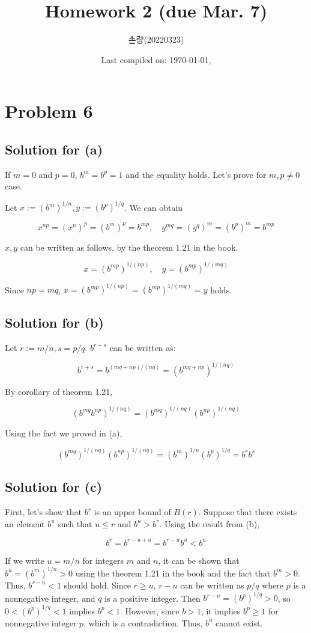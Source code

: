 \documentclass{scrartcl}
\title{Homework 2 (due Mar. 7)}
\author{손량(20220323)}
\date{Last compiled on: \today, \currenttime}
\begin{document}
\maketitle

\section{Problem 6}
\subsection{Solution for (a)}
If \(m = 0\) and \(p = 0\), \(b^m = b^p = 1\) and the equality holds.
Let's prove for \(m, p \not = 0\) case.

Let \(x := (b^m)^{1 / n}, y := (b^p)^{1 / q}\). We can obtain

\[
  x^{np} = (x^n)^p = (b^m)^p = b^{mp},\quad y^{mq} = (y^q)^m = (b^p)^m = b^{mp}
\]

\(x, y\) can be written as follows, by the theorem 1.21 in the book.

\[
  x = (b^{mp})^{1 / (np)}, \quad y = (b^{mp})^{1 / (mq)}
\]

Since \(np = mq\), \(x = (b^{mp})^{1 / (np)} = (b^{mp})^{1 / (mq)} = y\) holds.

\subsection{Solution for (b)}
Let \(r := m / n, s = p / q\). \(b^{r + s}\) can be written as:

\[
  b^{r + s} = b^{(mq + np) / (nq)} = (b^{mq + np})^{1 / (nq)}
\]

By corollary of theorem 1.21,

\[
  (b^{mq} b^{np})^{1 / (nq)} = (b^{mq})^{1 / (nq)} (b^{np})^{1 / (nq)}
\]

Using the fact we proved in (a),

\[
  (b^{mq})^{1 / (nq)} (b^{np})^{1 / (nq)} = (b^m)^{1 / n} (b^p)^{1 / q} = b^r b^s
\]

\subsection{Solution for (c)}
First, let's show that \(b^r\) is an upper bound of \(B(r)\).
Suppose that there exists an element \(b^u\) such that \(u \leq r\) and \(b^u > b^r\).
Using the result from (b),

\[
  b^r = b^{r - u + u} = b^{r - u} b^u < b^u
\]

If we write \(u = m / n\) for integers \(m\) and \(n\), it can be shown that \(b^u = (b^m)^{1 / n} > 0\) using the theorem 1.21 in the book and the fact that \(b^m > 0\).
Thus, \(b^{r - u} < 1\) should hold. Since \(r \geq u\), \(r - u\) can be written as \(p / q\) where \(p\) is a nonnegative integer, and \(q\) is a positive integer.
Then \(b^{r - u} = (b^p)^{1 / q} > 0\), so \(0 < (b^p)^{1 / q} < 1\) implies \(b^p < 1\).
However, since \(b > 1\), it implies \(b^p \geq 1\) for nonnegative integer \(p\), which is a contradiction.
Thus, \(b^u\) cannot exist.
\end{document}
